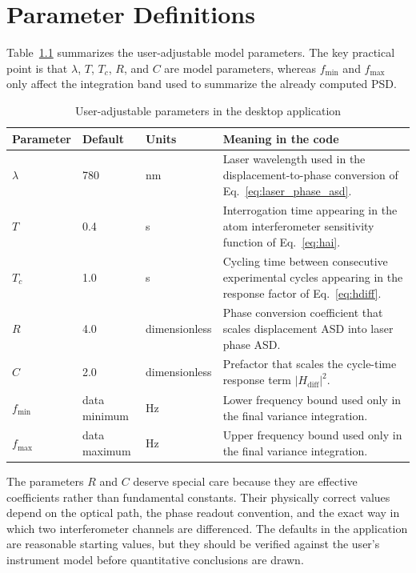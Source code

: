 \documentclass[11pt,a4paper]{report}
\newcommand{\tableheader}[1]{\textbf{\color{white}#1}}
\begin{document}
\chapter{Parameter Definitions}

Table~\ref{tab:parameters} summarizes the user-adjustable model parameters. The key practical point is that $\lambda$, $T$, $T_c$, $R$, and $C$ are model parameters, whereas $f_{\min}$ and $f_{\max}$ only affect the integration band used to summarize the already computed PSD.

\begin{table}[H]
\centering
\caption{User-adjustable parameters in the desktop application}
\label{tab:parameters}
\begin{tabularx}{\textwidth}{@{}l l l X@{}}
\toprule
\rowcolor{primaryblue}
\tableheader{Parameter} & \tableheader{Default} & \tableheader{Units} & \tableheader{Meaning in the code} \\
\midrule
$\lambda$ & 780 & nm & Laser wavelength used in the displacement-to-phase conversion of Eq.~\eqref{eq:laser_phase_asd}. \\
\rowcolor{tablealt}
$T$ & 0.4 & s & Interrogation time appearing in the atom interferometer sensitivity function of Eq.~\eqref{eq:hai}. \\
$T_c$ & 1.0 & s & Cycling time between consecutive experimental cycles appearing in the response factor of Eq.~\eqref{eq:hdiff}. \\
\rowcolor{tablealt}
$R$ & 4.0 & dimensionless & Phase conversion coefficient that scales displacement ASD into laser phase ASD. \\
$C$ & 2.0 & dimensionless & Prefactor that scales the cycle-time response term $|H_{\mathrm{diff}}|^2$. \\
\rowcolor{tablealt}
$f_{\min}$ & data minimum & Hz & Lower frequency bound used only in the final variance integration. \\
$f_{\max}$ & data maximum & Hz & Upper frequency bound used only in the final variance integration. \\
\bottomrule
\end{tabularx}
\end{table}

The parameters $R$ and $C$ deserve special care because they are effective coefficients rather than fundamental constants. Their physically correct values depend on the optical path, the phase readout convention, and the exact way in which two interferometer channels are differenced. The defaults in the application are reasonable starting values, but they should be verified against the user's instrument model before quantitative conclusions are drawn.
\end{document}
